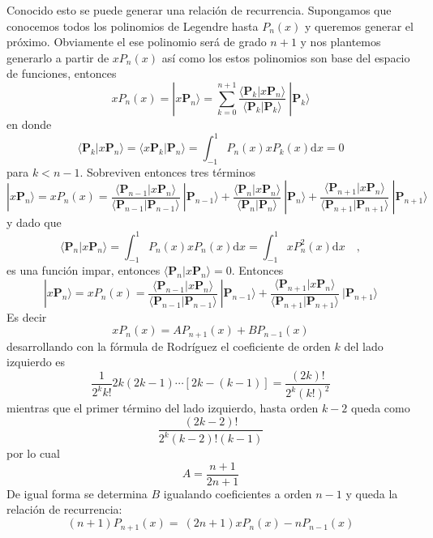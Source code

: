 \documentclass[spanish,notitlepage,letterpaper,12pt]{article}
\begin{document}
Conocido esto se puede generar una relaci\'{o}n de recurrencia. Supongamos que
conocemos todos los polinomios de Legendre hasta $P_{n}(x)$ y queremos generar
el pr\'{o}ximo. Obviamente el ese polinomio ser\'{a} de grado $n+1$ y nos
plantemos generarlo a partir de $xP_{n}(x)$ as\'{i} como los estos polinomios
son base del espacio de funciones, entonces
\[
xP_{n}(x)=|x\mathbf{P}_{n}\rangle=\sum_{k=0}^{n+1}\frac{\langle\mathbf{P}%
_{k}|x\mathbf{P}_{n}\rangle}{\langle\mathbf{P}_{k}|\mathbf{P}_{k}\rangle
}\ |\mathbf{P}_{k}\rangle
\]
en donde
\[
\langle\mathbf{P}_{k}|x\mathbf{P}_{n}\rangle=\langle x\mathbf{P}%
_{k}|\mathbf{P}_{n}\rangle=\int_{-1}^{1}P_{n}(x)xP_{k}(x)\mathrm{d}x=0
\]
para $k<n-1.$ Sobreviven entonces tres t\'{e}rminos
\[
|x\mathbf{P}_{n}\rangle=xP_{n}(x)=\frac{\langle\mathbf{P}_{n-1}|x\mathbf{P}%
_{n}\rangle}{\langle\mathbf{P}_{n-1}|\mathbf{P}_{n-1}\rangle}\ |\mathbf{P}%
_{n-1}\rangle+\frac{\langle\mathbf{P}_{n}|x\mathbf{P}_{n}\rangle}%
{\langle\mathbf{P}_{n}|\mathbf{P}_{n}\rangle}\ |\mathbf{P}_{n}\rangle
+\frac{\langle\mathbf{P}_{n+1}|x\mathbf{P}_{n}\rangle}{\langle\mathbf{P}%
_{n+1}|\mathbf{P}_{n+1}\rangle}\ |\mathbf{P}_{n+1}\rangle
\]
y dado que
\[
\langle\mathbf{P}_{n}|x\mathbf{P}_{n}\rangle=\int_{-1}^{1}P_{n}(x)xP_{n}%
(x)\mathrm{d}x=\int_{-1}^{1}xP_{n}^{2}(x)\mathrm{d}x\quad,
\]
es una funci\'{o}n impar, entonces $\langle\mathbf{P}_{n}|x\mathbf{P}%
_{n}\rangle=0.$ Entonces
\[
|x\mathbf{P}_{n}\rangle=xP_{n}(x)=\frac{\langle\mathbf{P}_{n-1}|x\mathbf{P}%
_{n}\rangle}{\langle\mathbf{P}_{n-1}|\mathbf{P}_{n-1}\rangle}\ |\mathbf{P}%
_{n-1}\rangle+\frac{\langle\mathbf{P}_{n+1}|x\mathbf{P}_{n}\rangle}%
{\langle\mathbf{P}_{n+1}|\mathbf{P}_{n+1}\rangle}\ |\mathbf{P}_{n+1}\rangle
\]
Es decir
\[
xP_{n}(x)=AP_{n+1}(x)+BP_{n-1}(x)
\]
desarrollando con la f\'{o}rmula de Rodr\'{i}guez el coeficiente de orden $k$
del lado izquierdo es
\[
\frac{1}{2^{k}k!}2k(2k-1)\cdots\left[  2k-(k-1)\right]  =\frac{(2k)!}%
{2^{k}(k!)^{2}}%
\]
mientras que el primer t\'{e}rmino del lado izquierdo, hasta orden $k-2$ queda
como
\[
\frac{(2k-2)!}{2^{k}(k-2)!(k-1)}%
\]
por lo cual
\[
A=\frac{n+1}{2n+1}%
\]
De igual forma se determina $B$ igualando coeficientes a orden $n-1$ y queda
la relaci\'{o}n de recurrencia:
\[
\left(  n+1\right)  P_{n+1}(x)=\ \left(  2n+1\right)  xP_{n}(x)-nP_{n-1}(x)
\]
\end{document}
